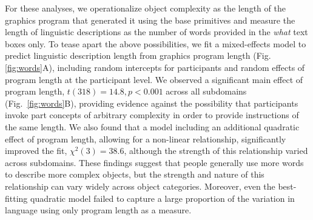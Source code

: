 \documentclass[10pt,letterpaper]{article}
\begin{document}

For these analyses, we operationalize object complexity as the length of the graphics program that generated it using the base primitives and measure the length of linguistic descriptions as the number of words provided in the \textit{what} text boxes only.
To tease apart the above possibilities, we fit a mixed-effects model to predict linguistic description length from graphics program length (Fig. \ref{fig:words}A), including random intercepts for participants and random effects of program length at the participant level.
We observed a significant main effect of program length, $t(318)=14.8, p < 0.001$ across all subdomains (Fig.~\ref{fig:words}B), providing evidence against the possibility that participants invoke part concepts of arbitrary complexity in order to provide instructions of the same length. 
We also found that a model including an additional quadratic effect of program length, allowing for a non-linear relationship, significantly improved the fit, $\chi^2(3)=38.6$, although the strength of this relationship varied across subdomains.
These findings suggest that people generally use more words to describe more complex objects, but the strength and nature of this relationship can vary widely across object categories. 
Moreover, even the best-fitting quadratic model failed to capture a large proportion of the variation in language using only program length as a measure. %

\end{document}
